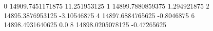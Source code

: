 0 14909.7451171875 11.251953125
1 14899.7880859375 1.294921875
2 14895.3876953125 -3.10546875
4 14897.6884765625 -0.8046875
6 14898.4931640625 0.0
8 14898.0205078125 -0.47265625
